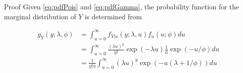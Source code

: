 \documentclass[aspectratio=169]{beamer}
\begin{document}
\begin{frame}{Proof}
\protect\hypertarget{proof-1}{}
Given \eqref{eq:pdfPois} and \eqref{eq:pdfGamma}, the probability
function for the marginal distribution of \(Y\) is determined from

\begin{equation}
  \begin{aligned}
    g_{Y}(y;\lambda,\phi)&=\int_{u=0}^\infty f_{Y|u}(y;\lambda, u) f_{u}(u;\phi) du \\
    &=\int_{u=0}^\infty \frac{(\lambda u)^y}{y!} \exp (-\lambda u) \frac{1}{\phi} \exp (-u/\phi) du\\
    &=\frac{1}{y!\phi} \int_{u=0}^\infty (\lambda u)^y \exp (-u(\lambda+1/\phi)) du
  \end{aligned}
\end{equation}
\end{frame}
\end{document}
